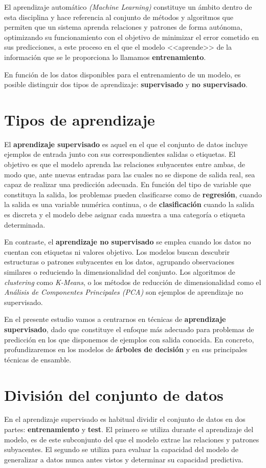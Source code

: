 \documentclass[titlepage, 11pt]{book}
\begin{document}
El aprendizaje automático \textit{(Machine Learning)} constituye un ámbito dentro de esta disciplina y hace referencia al conjunto de métodos y algoritmos que permiten que un sistema aprenda relaciones y patrones de forma autónoma, optimizando su funcionamiento con el objetivo de minimizar el error cometido en sus predicciones, a este proceso en el que el modelo <<aprende>> de la información que se le proporciona lo llamamos \textbf{entrenamiento}.

En función de los datos disponibles para el entrenamiento de un modelo, es posible distinguir dos tipos de aprendizaje: \textbf{supervisado} y \textbf{no supervisado}.

\section{Tipos de aprendizaje}
El \textbf{aprendizaje supervisado} es aquel en el que el conjunto de datos incluye ejemplos de entrada junto con sus correspondientes salidas o etiquetas. El objetivo es que el modelo aprenda las relaciones subyacentes entre ambas, de modo que, ante nuevas entradas para las cuales no se dispone de salida real, sea capaz de realizar una predicción adecuada. En función del tipo de variable que constituya la salida, los problemas pueden clasificarse como de \textbf{regresión}, cuando la salida es una variable numérica continua, o de \textbf{clasificación} cuando la salida es discreta y el modelo debe asignar cada muestra a una categoría o etiqueta determinada.

En contraste, el \textbf{aprendizaje no supervisado} se emplea cuando los datos no cuentan con etiquetas ni valores objetivo. Los modelos buscan descubrir estructuras o patrones subyacentes en los datos, agrupando observaciones similares o reduciendo la dimensionalidad del conjunto. Los algoritmos de \textit{clustering} como \textit{K-Means}, o los métodos de reducción de dimensionalidad como el \textit{Análisis de Componentes Principales (PCA)} son ejemplos de aprendizaje no supervisado.

En el presente estudio vamos a centrarnos en técnicas de \textbf{aprendizaje supervisado}, dado que constituye el enfoque más adecuado para problemas de predicción en los que disponemos de ejemplos con salida conocida. En concreto, profundizaremos en los modelos de \textbf{árboles de decisión} y en sus principales técnicas de ensamble.

\section{División del conjunto de datos} \label{sec:div_dataset}
En el aprendizaje supervisado es habitual dividir el conjunto de datos en dos partes: \textbf{entrenamiento} y \textbf{test}. El primero se utiliza durante el aprendizaje del modelo, es de este subconjunto del que el modelo extrae las relaciones y patrones subyacentes. El segundo se utiliza para evaluar la capacidad del modelo de generalizar a datos nunca antes vistos y determinar su capacidad predictiva.
\end{document}
